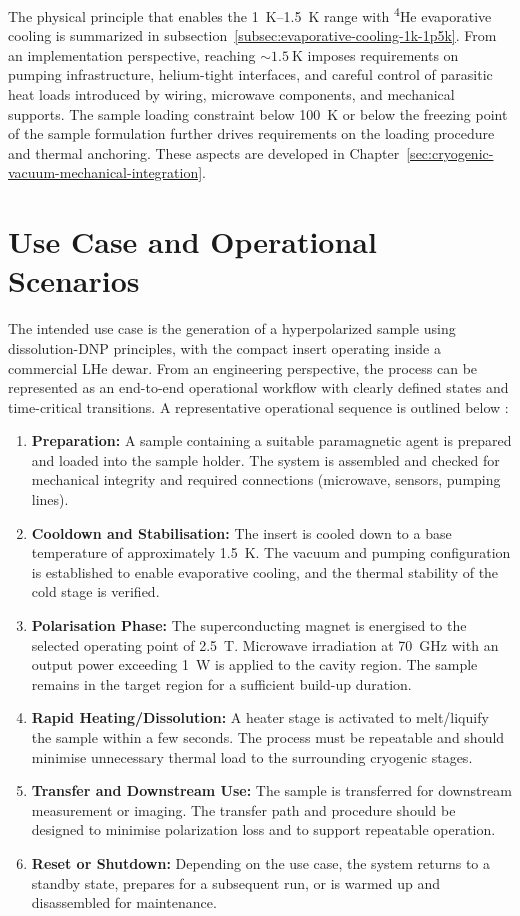\documentclass[FM,DP,EN,twoside]{tulthesis}
\begin{document}
The physical principle that enables the \SIrange{1}{1.5}{\kelvin} range with \textsuperscript{4}He evaporative cooling is summarized in subsection~\ref{subsec:evaporative-cooling-1k-1p5k}. From an implementation perspective, reaching $\sim \SI{1.5}{\kelvin}$ imposes requirements on pumping infrastructure, helium-tight interfaces, and careful control of parasitic heat loads introduced by wiring, microwave components, and mechanical supports. The sample loading constraint below \SI{100}{\kelvin} or below the freezing point of the sample formulation further drives requirements on the loading procedure and thermal anchoring. These aspects are developed in Chapter~\ref{sec:cryogenic-vacuum-mechanical-integration}.



\section{Use Case and Operational Scenarios}
\label{sec:use-case-operational-scenarios}
The intended use case is the generation of a hyperpolarized sample using dissolution-DNP principles, with the compact insert operating inside a commercial LHe dewar. From an engineering perspective, the process can be represented as an end-to-end operational workflow with clearly defined states and time-critical transitions. A representative operational sequence is outlined below \cite{dissolution_dnp_workflow_ref}\cite{feynman_1955}:
\begin{enumerate}
  \item \textbf{Preparation:} A sample containing a suitable paramagnetic agent is prepared and loaded into the sample holder. The system is assembled and checked for mechanical integrity and required connections (microwave, sensors, pumping lines).
  \item \textbf{Cooldown and Stabilisation:} The insert is cooled down to a base temperature of approximately \SI{1.5}{\kelvin}. The vacuum and pumping configuration is established to enable evaporative cooling, and the thermal stability of the cold stage is verified.
  \item \textbf{Polarisation Phase:} The superconducting magnet is energised to the selected operating point of \SI{2.5}{\tesla}. Microwave irradiation at \SI{70}{\giga\hertz} with an output power exceeding \SI{1}{\watt} is applied to the cavity region. The sample remains in the target region for a sufficient build-up duration.
  \item \textbf{Rapid Heating/Dissolution:} A heater stage is activated to melt/liquify the sample within a few seconds. The process must be repeatable and should minimise unnecessary thermal load to the surrounding cryogenic stages.
  \item \textbf{Transfer and Downstream Use:} The sample is transferred for downstream measurement or imaging. The transfer path and procedure should be designed to minimise polarization loss and to support repeatable operation.
  \item \textbf{Reset or Shutdown:} Depending on the use case, the system returns to a standby state, prepares for a subsequent run, or is warmed up and disassembled for maintenance.
\end{enumerate}
\end{document}
